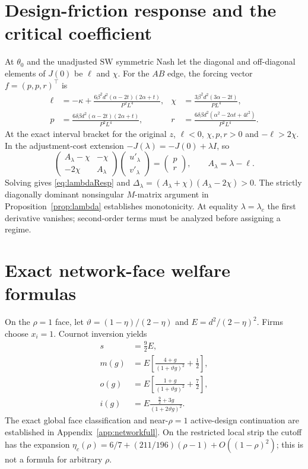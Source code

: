 \documentclass[11pt,a4paper]{article}
\theoremstyle{remark}\newtheorem{remark}[theorem]{Remark}
\newcommand{\SW}{\mathrm{SW}}\newcommand{\SU}{\mathrm{SU}}\newcommand{\IS}{\mathrm{IS}}
\begin{document}
\section{Design-friction response and the critical coefficient}\label{app:lambda}
At $\theta_0$ and the unadjusted $\SW$ symmetric Nash let the diagonal and off-diagonal elements of $J(0)$ be $\ell$ and $\chi$. For the $AB$ edge, the forcing vector $f=(p,p,r)^{\top}$ is
\begin{align}
\ell&=-\kappa+\frac{6\beta^2d^2(\alpha-2t)(2\alpha+t)}{P^2L^4},
&\chi&=\frac{3\beta^2d^2(3\alpha-2t)}{PL^4},\\
p&=\frac{6\delta\beta d^2(\alpha-2t)(2\alpha+t)}{P^2L^4},
&r&=\frac{6\delta\beta d^2(\alpha^2-2\alpha t+4t^2)}{P^2L^4}.
\end{align}
At the exact interval bracket for the original $z$, $\ell<0$, $\chi,p,r>0$ and $-\ell>2\chi$. In the adjustment-cost extension $-J(\lambda)=-J(0)+\lambda I$, so
\[
\begin{pmatrix} A_\lambda-\chi &-\chi\\ -2\chi&A_\lambda\end{pmatrix}
\begin{pmatrix}u'_\lambda\\v'_\lambda\end{pmatrix}=
\begin{pmatrix}p\\r\end{pmatrix},\qquad A_\lambda=\lambda-\ell.
\]
Solving gives \eqref{eq:lambdaResp} and $\Delta_\lambda=(A_\lambda+\chi)(A_\lambda-2\chi)>0$. The strictly diagonally dominant nonsingular $M$-matrix argument in Proposition~\ref{prop:lambda} establishes monotonicity. At equality $\lambda=\lambda_c$ the first derivative vanishes; second-order terms must be analyzed before assigning a regime.

\section{Exact network-face welfare formulas}\label{app:network}
On the $\rho=1$ face, let $\vartheta=(1-\eta)/(2-\eta)$ and $E=d^2/(2-\eta)^2$. Firms choose $x_i=1$. Cournot inversion yields
\begin{equation}\label{eq:face}
\begin{split}
s&=\tfrac92 E,\\
m(g)&=E\left[\frac{4+g}{(1+\vartheta g)^2}+\tfrac12\right],\\
o(g)&=E\left[\frac{1+g}{(1+\vartheta g)^2}+\tfrac72\right],\\
i(g)&=E\frac{\tfrac92+3g}{(1+2\vartheta g)^2}.
\end{split}
\end{equation}
The exact global face classification and near-$\rho=1$ active-design continuation are established in Appendix~\ref{app:networkfull}. On the restricted local strip the cutoff has the expansion $\eta_c(\rho)=6/7+(211/196)(\rho-1)+O((1-\rho)^2)$; this is not a formula for arbitrary $\rho$.
\end{document}
